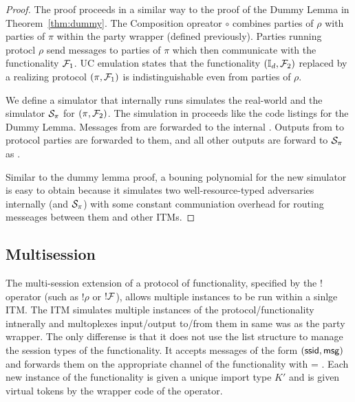\begin{proof}
The proof proceeds in a similar way to the proof of the Dummy Lemma in Theorem~\ref{thm:dummy}. 
The Composition opreator $\circ$ combines parties of $\rho$ with parties of $\pi$ within the party wrapper (defined previously). 
Parties running protocl $\rho$ send messages to parties of $\pi$ which then communicate with the functionality $\mathcal{F}_1$.
UC emulation states that the functionality $(\mathbb{I}_d, \mathcal{F}_2)$ replaced by a realizing protocol $(\pi, \mathcal{F}_1)$ is indistinguishable even from parties of $\rho$.

We define a simulator \Simulator that internally runs simulates the real-world \Adversary and the simulator $\mathcal{S}_\pi$ for $(\pi, \mathcal{F}_2)$.
The simulation in \Simulator proceeds like the code listings for the Dummy Lemma.
Messages from \Environment are forwarded to the internal \Adversary. 
Outputs from \Adversary to protocol parties are forwarded to them, and all other outputs are forward to $\mathcal{S}_\pi$ as \Environment.

Similar to the dummy lemma proof, a bouning polynomial for the new simulator \Simulator is easy to obtain because it simulates two well-resource-typed adversaries internally (\Adversary and $\mathcal{S}_\pi$) with some constant communiation overhead for routing messeages between them and other ITMs. 
\end{proof}

\subsection{Multisession}
The multi-session extension of a protocol of functionality, specified by the $!$ operator (such as $!\rho$ or $!\mathcal{F}$), allows multiple instances to be run within a sinlge ITM.
The ITM simulates multiple instances of the protocol/functionality intnerally and multoplexes input/output to/from them in same was as the party wrapper.
The only differense is that it does not use the list structure to manage the session types of the functionality.
It accepts messages of the form $({\mathsf {ssid}}, {\mathsf {msg}})$ and forwards them on the appropriate channel of the functionality with  = .
Each new instance of the functionality is given a unique import type $K'$ and is given virtual tokens by the wrapper code of the operator.


